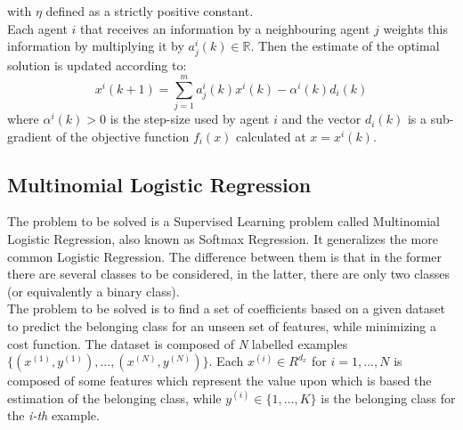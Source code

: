 \documentclass[a4paper,11pt,oneside]{book}
\begin{document}
with $\eta$ defined as a strictly positive constant.\\
Each agent $i$ that receives an information by a neighbouring agent $j$ weights this information by multiplying it by $a_j^i(k) \in \mathbb{R}$. Then the estimate of the optimal solution is updated according to:
\begin{equation} \label{update}
x^i\left(k+1\right) = \sum_{j=1}^{m}{a_j^i\left(k\right)x^i\left(k\right)-\alpha^i\left(k\right)d_i\left(k\right)}
\end{equation}
where $\alpha^i(k)>0$ is the step-size used by agent $i$ and the vector $d_i(k)$ is a sub-gradient of the objective function $f_i(x)$ calculated at $x=x^i(k)$. \cite{CITATION:1}

\subsection {Multinomial Logistic Regression} \label{Subsec1.1.2}
The problem to be solved is a Supervised Learning problem called Multinomial Logistic Regression, also known as Softmax Regression. It generalizes the more common Logistic Regression. The difference between them is that in the former there are several classes to be considered, in the latter, there are only two classes (or equivalently a binary class).\\
The problem to be solved is to find a set of coefficients based on a given dataset to predict the belonging class for an unseen set of features, while minimizing a cost function. The dataset is composed of \textit{N} labelled examples $\{(x^{(1)}, y^{(1)}), ..., (x^{(N)}, y^{(N)})\}$. Each $x^{(i)} \in R^{d_{x}}$ for $i=1, ..., N$ is composed of some features which represent the value upon which is based the estimation of the belonging class, while $y^{(i)} \in \{ 1, \dots, K \}$ is the belonging class for the \textit{i-th} example.
\end{document}
